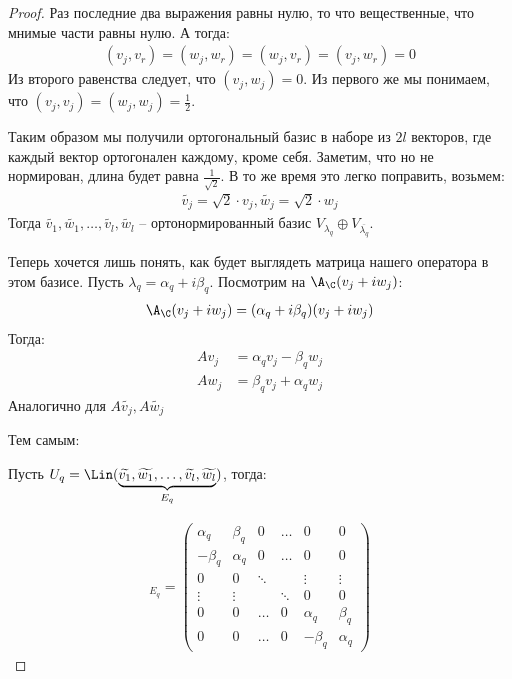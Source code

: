 \begin{theorem}
\begin{proof}
    Раз последние два выражения равны нулю, то что вещественные, что мнимые части равны нулю. А тогда:
    \begin{gather*}
        (v_j, v_r) = (w_j, w_r) = (w_j, v_r) = (v_j, w_r) = 0
    \end{gather*}
    Из второго равенства следует, что $(v_j, w_j) = 0$.
    Из первого же мы понимаем, что $(v_j, v_j) = (w_j, w_j) = \frac{1}{2}$.

    Таким образом мы получили ортогональный базис в наборе из $2l$ векторов, где каждый вектор ортогонален каждому, кроме себя. Заметим, что но не нормирован, длина будет равна $\frac{1}{\sqrt{2}}$. В то же время это легко поправить, возьмем:
    \begin{gather*}
        \widetilde{v_j} = \sqrt{2} \cdot v_j, \widetilde{w_j} = \sqrt{2} \cdot w_j
    \end{gather*}
    Тогда $\widetilde{v_1}, \widetilde{w_1}, \dots, \widetilde{v_l}, \widetilde{w_l}$ -- ортонормированный базис $V_{\lambda_q} \oplus V_{\overline{\lambda_{q}}}$.

    Теперь хочется лишь понять, как будет выглядеть матрица нашего оператора в этом базисе. 
    Пусть $\lambda_q = \alpha_q + i \beta_q$. 
    Посмотрим на $\A_{\C}(v_j + iw_j)$:
    \begin{gather*}
        \A_{\C}(v_j + iw_j) = (\alpha_q + i \beta_q) (v_j + iw_j)
    \end{gather*}
    Тогда:
    \begin{align*}
        Av_j &= \alpha_q v_j -  \beta_q w_j \\
        Aw_j &= \beta_q v_j + \alpha_q w_j
    \end{align*}
    Аналогично для $A\widetilde{v_{j}}, A\widetilde{w_{j}}$

    Тем самым: 

    Пусть $U_q = \Lin (\underbrace{\widetilde{v_1}, \widetilde{w_1}, \dots, \widetilde{v_l}, \widetilde{w_l}}_{\text{$ E_q $}} )$, тогда:
    
    \begin{gather*}
        [\A |_{U_q}]_{E_q} = \left(\begin{array}{cccccc}
        \alpha_q & \beta_q  & 0       & \dots    & 0        & 0\\ 
        -\beta_q & \alpha_q & 0       & \dots    & 0        & 0\\ 
        0        & 0        & \ddots  &          & \vdots   & \vdots \\ 
        \vdots   & \vdots   &         & \ddots   & 0        & 0 \\
        0        & 0        &  \dots  & 0        & \alpha_q & \beta_q \\ 
        0        & 0        & \dots   & 0        & -\beta_q & \alpha_q
        \end{array}\right)
    \end{gather*}   
\end{proof} 
\end{theorem}

